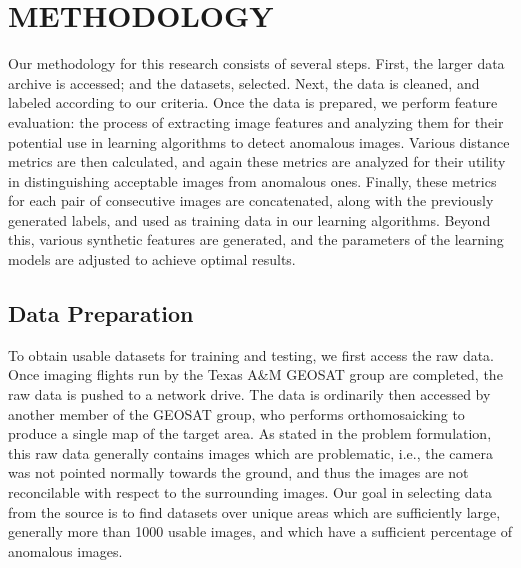 

\chapter{METHODOLOGY}

Our methodology for this research consists of several steps.
First, the larger data archive is accessed; and the datasets, selected.
Next, the data is cleaned, and labeled according to our criteria.
Once the data is prepared, we perform feature evaluation: the process of extracting image features and analyzing them for their potential use in learning algorithms to detect anomalous images.
Various distance metrics are then calculated, and again these metrics are analyzed for their utility in distinguishing acceptable images from anomalous ones.
Finally, these metrics for each pair of consecutive images are concatenated, along with the previously generated labels, and used as training data in our learning algorithms.
Beyond this, various synthetic features are generated, and the parameters of the learning models are adjusted to achieve optimal results.


\section{Data Preparation}

To obtain usable datasets for training and testing, we first access the raw data.
Once imaging flights run by the Texas A\&M GEOSAT group are completed, the raw data is pushed to a network drive.
The data is ordinarily then accessed by another member of the GEOSAT group, who performs orthomosaicking to produce a single map of the target area.
As stated in the problem formulation, this raw data generally contains images which are problematic, i.e., the camera was not pointed normally towards the ground, and thus the images are not reconcilable with respect to the surrounding images.
Our goal in selecting data from the source is to find datasets over unique areas which are sufficiently large, generally more than 1000 usable images, and which have a sufficient percentage of anomalous images.


